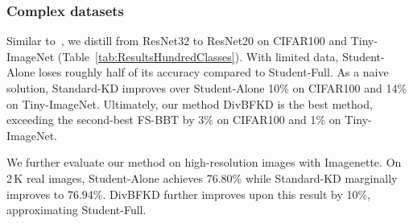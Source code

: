 \documentclass[12pt, a4paper, twoside]{book}
\numberwithin{equation}{chapter}
\theoremstyle{plain}
\theoremstyle{definition}
\theoremstyle{remark}
\newenvironment{foldable}{}{}
\begin{document}
\subsubsection{Complex datasets} \label{sec:experiments-complex-datasets}
\begin{foldable}
  Similar to~\cite{wang2020neural,nguyen2022black,kong2020learning}, we distill from ResNet32 to ResNet20 on CIFAR100 and Tiny-ImageNet (Table~\ref{tab:ResultsHundredClasses}).
  With limited data, Student-Alone loses roughly half of its accuracy compared to Student-Full.
  As a naive solution, Standard-KD improves over Student-Alone 10\% on CIFAR100 and 14\% on Tiny-ImageNet.
  Ultimately, our method DivBFKD is the best method, exceeding the second-best FS-BBT by 3\% on CIFAR100 and 1\% on Tiny-ImageNet.
\end{foldable}

\begin{foldable}
  We further evaluate our method on high-resolution images with Imagenette.
  On 2\,K real images, Student-Alone achieves 76.80\% while Standard-KD marginally improves to 76.94\%.
  DivBFKD further improves upon this result by 10\%, approximating Student-Full.
\end{foldable}
\end{document}
